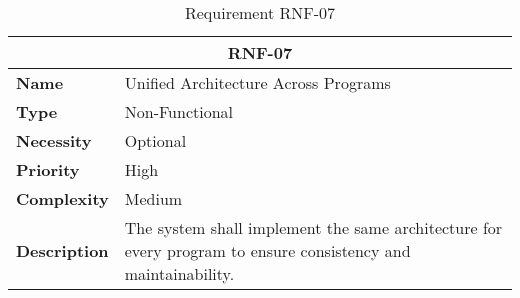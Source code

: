 \begin{table}[H]
    \centering
    \begin{tabular}{l p{10cm}}
        \toprule
        \multicolumn{2}{c}{\textbf{RNF-07}} \\
        \toprule
        \textbf{Name}         & Unified Architecture Across Programs \\
        \textbf{Type}         & Non-Functional \\
        \textbf{Necessity}    & Optional \\
        \textbf{Priority}     & High \\
        \textbf{Complexity}   & Medium \\
        \textbf{Description}  & The system shall implement the same architecture for every program to ensure consistency and maintainability. \\
        \bottomrule
    \end{tabular}
\caption{Requirement RNF-07}\label{tab:rnf-07}
\end{table}
